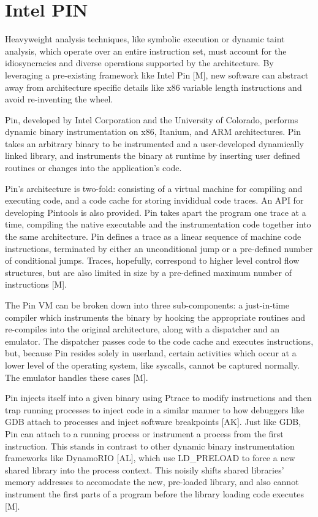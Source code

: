 \documentclass[11pt,expanded,copyright]{fsuthesis}
\begin{document}
\section{Intel PIN}

Heavyweight analysis techniques, like symbolic execution or dynamic taint analysis, which operate over an entire instruction set, must account for the idiosyncracies and diverse operations supported by the architecture. By leveraging a pre-existing framework like Intel Pin [M], new software can abstract away from architecture specific details like x86 variable length instructions and avoid re-inventing the wheel.

Pin, developed by Intel Corporation and the University of Colorado, performs dynamic binary instrumentation on x86, Itanium, and ARM architectures. Pin takes an arbitrary binary to be instrumented and a user-developed dynamically linked library, and instruments the binary at runtime by inserting user defined routines or changes into the application's code.

Pin's architecture is two-fold: consisting of a virtual machine for compiling and executing code, and a code cache for storing invididual code traces. An API for developing Pintools is also provided. Pin takes apart the program one trace at a time, compiling the native executable and the instrumentation code together into the same architecture. Pin defines a trace as a linear sequence of machine code instructions, terminated by either an unconditional jump or a pre-defined number of conditional jumps. Traces, hopefully, correspond to higher level control flow structures, but are also limited in size by a pre-defined maximum number of instructions [M].

The Pin VM can be broken down into three sub-components: a just-in-time compiler which instruments the binary by hooking the appropriate routines and re-compiles into the original architecture, along with a dispatcher and an emulator. The dispatcher passes code to the code cache and executes instructions, but, because Pin resides solely in userland, certain activities which occur at a lower level of the operating system, like syscalls, cannot be captured normally. The emulator handles these cases [M].

Pin injects itself into a given binary using Ptrace to modify instructions and then trap running processes to inject code in a similar manner to how debuggers like GDB attach to processes and inject software breakpoints [AK]. Just like GDB, Pin can attach to a running process or instrument a process from the first instruction. This stands in contrast to other dynamic binary instrumentation frameworks like DynamoRIO [AL], which use LD\_PRELOAD to force a new  shared library into the process context. This noisily shifts shared libraries' memory addresses to accomodate the new, pre-loaded library, and also cannot instrument the first parts of a program before the library loading code executes [M].
\end{document}
